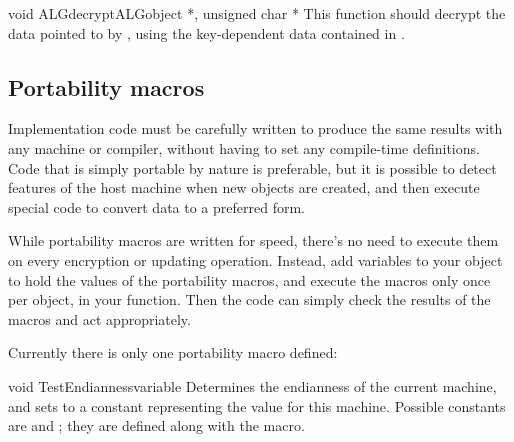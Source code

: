 \documentclass{howto}
\begin{document}
\begin{funcdesc}{void ALGdecrypt}{\rm ALGobject *, unsigned char *}
This function should decrypt the data pointed to by , using
the key-dependent data contained in .
\end{funcdesc}

\subsection{Portability macros}

Implementation code must be carefully written to produce the same
results with any machine or compiler, without having to set any
compile-time definitions.  Code that is simply portable by nature is
preferable, but it is possible to detect features of the host machine
when new objects are created, and then execute special code to convert
data to a preferred form.

While portability macros are written for speed, there's no need to
execute them on every encryption or updating operation.  Instead, add
variables to your object to hold the values of the portability macros,
and execute the macros only once per object, in your
 function.  Then the code can simply check the
results of the macros and act appropriately.

Currently there is only one portability macro defined:

\begin{funcdesc}{void TestEndianness}{variable}
Determines the endianness of the current machine, and sets
 to a constant representing the value for this machine.
Possible constants are  and ;
they are defined along with the  macro.
\end{funcdesc}
\end{document}
